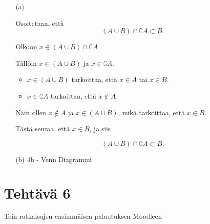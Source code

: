 \documentclass{article}
\begin{document}
\begin{enumerate}
	
\item[(a)]

Osoitetaan, että
\[
(A \cup B) \cap \complement A \subset B.
\]

Olkoon \(x \in (A \cup B) \cap \complement A\).

Tällöin \(x \in (A \cup B)\) ja \(x \in \complement A\).

\begin{itemize}
	\item \(x \in (A \cup B)\) tarkoittaa, että \(x \in A\) tai \(x \in B\).
	\item \(x \in \complement A\) tarkoittaa, että \(x \notin A\).
\end{itemize}

Näin ollen \(x \notin A\) ja \(x \in (A \cup B)\), mikä tarkoittaa, että \(x \in B\).

Tästä seuraa, että \(x \in B\), ja siis

\[
(A \cup B) \cap \complement A \subset B.
\]


\item[(b)]
4b - Venn Diagrammi


\end{enumerate}


\newpage

\section*{Tehtävä 6}

Tein ratkaisujen ensimmäisen palautuksen Moodleen \date{\today}
\end{document}
